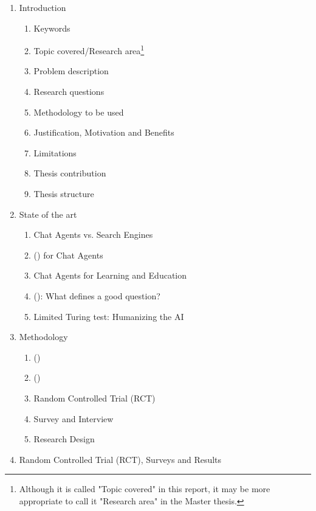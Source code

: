 \begin{enumerate}[label*=\arabic*.]
	\item Introduction	
	\begin{enumerate}[label*=\arabic*.]
		\item Keywords
		\item Topic covered/Research area\footnote{Although it is called "Topic covered" in this report, it may be more appropriate to call it "Research area" in the Master thesis.}
		\item Problem description
		\item Research questions
		\item Methodology to be used
		\item Justification, Motivation and Benefits
		\item Limitations
		\item Thesis contribution
		\item Thesis structure
	\end{enumerate}
	\item State of the art
	\begin{enumerate}[label*=\arabic*.]
		\item Chat Agents vs. Search Engines
		\item {} () for Chat Agents
		\item Chat Agents for Learning and Education
		\item {} (): What defines a good question?
		\item Limited Turing test: Humanizing the AI
	\end{enumerate}
	\item Methodology
	\begin{enumerate}[label*=\arabic*.]
		\item {} ()
		\item {} ()
		\item Random Controlled Trial (RCT)
		\item Survey and Interview
		\item Research Design 
	\end{enumerate}
	\item Random Controlled Trial (RCT), Surveys and Results
	\begin{enumerate}[label*=\arabic*.]

\end{enumerate}
\end{enumerate}
